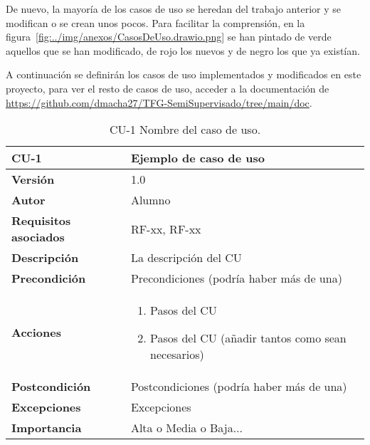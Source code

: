 De nuevo, la mayoría de los casos de uso se heredan del trabajo anterior y se modifican o se crean unos pocos. Para facilitar la comprensión, en la figura~\ref{fig:../img/anexos/CasosDeUso.drawio.png} se han pintado de verde aquellos que se han modificado, de rojo los nuevos y de negro los que ya existían.


A continuación se definirán los casos de uso implementados y modificados en este proyecto, para ver el resto de casos de uso, acceder a la documentación de \url{https://github.com/dmacha27/TFG-SemiSupervisado/tree/main/doc}.

\begin{table}[p]
	\centering
	\begin{tabularx}{\linewidth}{ p{} p{} }
		\toprule
		\textbf{CU-1}    & \textbf{Ejemplo de caso de uso}\\
		\toprule
		\textbf{Versión}              & 1.0    \\
		\textbf{Autor}                & Alumno \\
		\textbf{Requisitos asociados} & RF-xx, RF-xx \\
		\textbf{Descripción}          & La descripción del CU \\
		\textbf{Precondición}         & Precondiciones (podría haber más de una) \\
		\textbf{Acciones}             &
		\begin{enumerate}
			\def\labelenumi{\arabic{enumi}.}
			\tightlist
			\item Pasos del CU
			\item Pasos del CU (añadir tantos como sean necesarios)
		\end{enumerate}\\
		\textbf{Postcondición}        & Postcondiciones (podría haber más de una) \\
		\textbf{Excepciones}          & Excepciones \\
		\textbf{Importancia}          & Alta o Media o Baja... \\
		\bottomrule
	\end{tabularx}
	\caption{CU-1 Nombre del caso de uso.}
\end{table}
